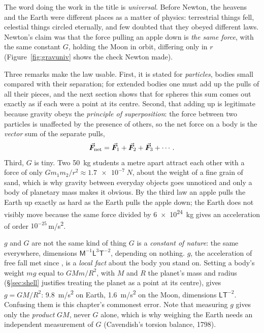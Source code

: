 The word doing the work in the title is \emph{universal}. Before Newton, the heavens and the Earth were
different places as a matter of physics: terrestrial things fell, celestial things circled eternally,
and few doubted that they obeyed different laws. Newton's claim was that the force pulling an apple down is
\emph{the same force}, with the same constant $G$, holding the Moon in orbit, differing only in $r$
(Figure~\ref{fig:gravuniv} shows the check Newton made).

Three remarks make the law usable. First, it is stated for \emph{particles}, bodies small compared with
their separation; for extended bodies one must add up the pulls of all their pieces, and the next section
shows that for spheres this sum comes out exactly as if each were a point at its centre. Second, that
adding up is legitimate because gravity obeys the \emph{principle of superposition}: the force between
two particles is unaffected by the presence of others, so the net force on a body is the \emph{vector}
sum of the separate pulls,
\[
\vec{\bm{F}}_{\text{net}}=\vec{\bm{F}}_1+\vec{\bm{F}}_2+\vec{\bm{F}}_3+\cdots .
\]
Third, $G$ is tiny. Two \SI{50}{kg} students a metre apart attract each other with a force
of only $Gm_1m_2/r^2\approx\SI{1.7e-7}{N}$, about the weight of a fine grain of
sand, which is
why gravity between everyday objects goes unnoticed and only a body of planetary mass makes it obvious.
By the third law an apple pulls the Earth up exactly as hard as the Earth pulls the apple
down; the Earth does not visibly move because the same force divided by \SI{6e24}{kg} gives an
acceleration of order $10^{-25}$\,\si{m/s^2}.

\begin{figure}[htbp]
\centering
{}
\end{figure}

\begin{trapbox}{$g$ and $G$ are not the same kind of thing}
$G$ is a \emph{constant of nature}: the same everywhere, dimensions $\mathsf M^{-1}\mathsf L^3\mathsf T^{-2}$,
depending on nothing. $g$, the acceleration of free fall met since , is a
\emph{local fact} about the body you stand on. Setting a body's weight $mg$ equal to $GMm/R^2$, with $M$
and $R$ the planet's mass and radius (\S\ref{sec:shell} justifies treating the planet as a point at its
centre), gives $g=GM/R^2$: \SI{9.8}{m/s^2} on
Earth, \SI{1.6}{m/s^2} on the Moon, dimensions $\mathsf L\mathsf T^{-2}$. Confusing them is this chapter's
commonest error. Note that measuring $g$ gives only the \emph{product} $GM$, never $G$ alone, which is
why weighing the Earth needs an independent measurement of $G$ (Cavendish's torsion balance, 1798).
\end{trapbox}

